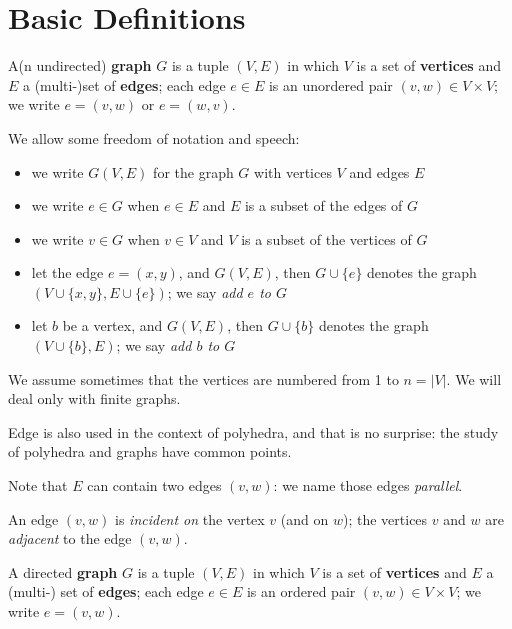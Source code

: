 \section{Basic Definitions}

\begin{definition}[Graph]
A(n undirected) \textbf{graph} $G$ is a tuple $(V,E)$ in which
$V$ is a set of \textbf{vertices} and $E$ a (multi-)set
of \textbf{edges}; each edge $e \in E$ is an unordered pair $(v,w) \in
V \times V$; we write $e = (v,w)$ or $e = (w,v)$.
\end{definition}

We allow some freedom of notation and speech:
\begin{itemize}
\item
we write $G(V,E)$ for the graph $G$ with vertices $V$ and edges $E$
\item
we write $e \in G$ when $e \in E$ and $E$ is a subset of the edges of $G$
\item
we write $v \in G$ when $v \in V$ and $V$ is a subset of the vertices of $G$
\item
let the edge $e = (x,y)$, and $G(V,E)$, then $G \cup \{e\}$ denotes
the graph $(V \cup \{x,y\},E \cup \{e\})$; we say {\em add $e$ to $G$}
\item
let $b$ be a vertex, and $G(V,E)$, then $G \cup \{b\}$ denotes the
graph $(V \cup \{b\},E )$; we say {\em add $b$ to $G$}
\end{itemize}

We assume sometimes that the vertices are numbered from 1 to $n =
|V|$. We will deal only with finite graphs.

Edge is also used in the context of polyhedra, and that is no
surprise: the study of polyhedra and graphs have common points.

Note that $E$ can contain two edges $(v,w)$: we name those edges {\em
parallel}.

An edge $(v,w)$ is {\em incident on} the vertex $v$ (and on $w$);
the vertices $v$ and $w$ are {\em adjacent} to the edge $(v,w)$.

\begin{definition}
A directed \textbf{graph} $G$ is a tuple $(V,E)$ in which
$V$ is a set of \textbf{vertices} and $E$ a (multi-) set
of \textbf{edges}; each edge $e \in E$ is an ordered pair $(v,w) \in
V \times V$; we write $e = (v,w)$.
\end{definition}

